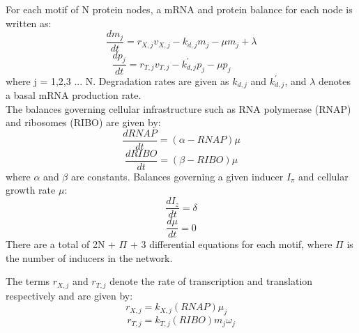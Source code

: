 \documentclass[12pt]{article}
\begin{document}
For each motif of N protein nodes, a mRNA and protein balance for each node is written as:
\begin{equation}\label{}
\frac{dm_{j}}{dt}=r_{X,j}v_{X,j} - k_{d,j}m_{j} - \mu m_{j} + \lambda
\end{equation}
\begin{equation}\label{}
\frac{dp_{j}}{dt}=r_{T,j}v_{T,j} - k^{'}_{d,j}p_{j} - \mu p_{j} \qquad
\end{equation}
where j = 1,2,3 ... N. Degradation rates are given as $k_{d,j}$ and $k^{'}_{d,j}$, and $\lambda$ denotes a basal mRNA production rate.\\
The balances governing cellular infrastructure such as RNA polymerase (RNAP) and ribosomes (RIBO) are given by: 
\begin{equation}\label{}
\frac{dRNAP}{dt}=(\alpha - RNAP)\mu
\end{equation}
\begin{equation}\label{}
\frac{dRIBO}{dt}=(\beta - RIBO)\mu
\end{equation}
where $\alpha$ and $\beta$ are constants.
Balances governing a given inducer $I_{\pi}$ and cellular growth rate $\mu$:
\begin{equation}\label{}
\frac{dI_{z}}{dt}=\delta
\end{equation}
\begin{equation}\label{}
\frac{d\mu}{dt}=0
\end{equation}
There are a total of 2N + $\Pi$ + 3 differential equations for each motif, where $\Pi$ is the number of inducers in the network. 

The terms $r_{X,j}$ and $r_{T,j}$ denote the rate of transcription and translation respectively and are given by:
\begin{equation}\label{}
r_{X,j} = k_{X,j}(RNAP)\mu_{j} \quad
\end{equation}
\begin{equation}\label{}
r_{T,j} = k_{T,j}(RIBO)m_{j}\omega_{j}
\end{equation}
\end{document}
